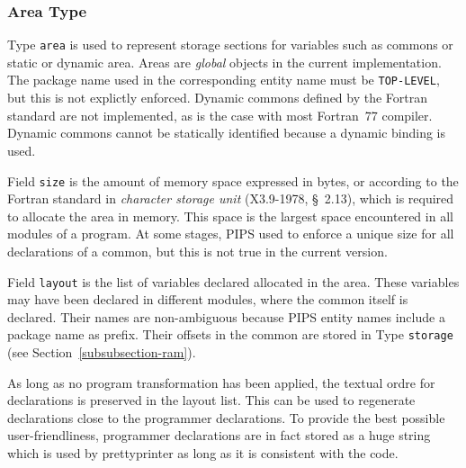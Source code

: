 \subsubsection{Area Type}
\label{subsubsection-area}


Type {\tt area} is used to represent storage sections for variables such
as commons or static or dynamic area. Areas are {\em global} objects in
the current implementation. The package name used in the corresponding
entity name must be \verb/TOP-LEVEL/, but this is not explictly
enforced. Dynamic commons defined by the Fortran standard are not
implemented, as is the case with most Fortran~77 compiler. Dynamic
commons cannot be statically identified because a dynamic binding is
used.

\iffalse
Le domaine {\tt area} est utilise' pour repre'senter les aires de
stockage des variables telles que les commons et les aires statiques ou
dynamiques. Ces aires sont des objets globaux et leur package de
rattachement est donc \verb/TOP-LEVEL/.
\fi

Field {\tt size} is the amount of memory space expressed in bytes, or
according to the Fortran standard in {\em character storage unit}
(X3.9-1978, \S~2.13), which is required to allocate the area in
memory. This space is the largest space encountered in all modules of a
program. At some stages, PIPS used to enforce a unique size for all
declarations of a common, but this is not true in the current version.

\iffalse
Le sous-domaine {\tt size} donne la taille de l'aire
exprime'e en octets ({\em character storage unit} de la norme ANSI
X3.9-1978, \S~2.13). Cette taille est la taille maximum rencontre'e
parmi les modules d'un programme. 
\fi

Field {\tt layout} is the list of variables declared allocated in the
area. These variables may have been declared in different modules, where
the common itself is declared. Their names are non-ambiguous because
PIPS entity names include a package name as prefix. Their offsets in the
common are stored in Type {\tt storage} (see
Section~\ref{subsubsection-ram}).

\iffalse
Le sous-domaine {\tt layout} donne la
liste des entite's stocke'es dans cette aire. Il s'agit des variables
de'clare'es dans ce common dans n'importe quel module.
\fi

As long as no program transformation has been applied, the textual ordre
for declarations is preserved in the layout list. This can be used to
regenerate declarations close to the programmer declarations. To provide
the best possible user-friendliness, programmer declarations are in fact
stored as a huge string which is used by prettyprinter as long as it is
consistent with the code.

